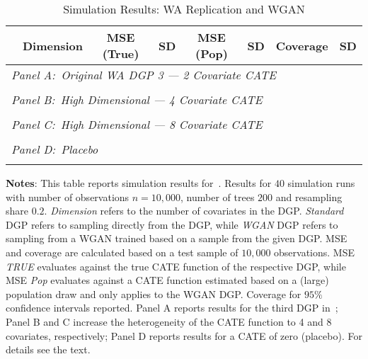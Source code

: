 \documentclass[11pt, a4paper, leqno]{article}
\begin{document}
\begin{table}
    \caption{Simulation Results: WA Replication and WGAN}\label{table:wa_rep_wgan}
    \begin{threeparttable}
        \center
        \begin{tabular}{lccccccc}
            & Dimension & MSE (True) & SD & MSE (Pop) & SD & Coverage & SD \\
            \toprule
            \multicolumn{8}{l}{\textit{Panel A:\ Original WA DGP 3 --- 2 Covariate CATE}} \\
             \\
            \midrule

            \multicolumn{8}{l}{\textit{Panel B:\ High Dimensional --- 4 Covariate CATE}} \\
             \\
            \midrule

            \multicolumn{8}{l}{\textit{Panel C:\ High Dimensional --- 8 Covariate CATE}} \\
             \\
            \midrule

            \multicolumn{8}{l}{\textit{Panel D:\ Placebo}} \\
             \\
            \bottomrule
        \end{tabular}
        \begin{tablenotes}
            \small
            \item \textbf{Notes}: This table reports simulation results for~\citet{wager2018estimation}.
            Results for $40$ simulation runs with number of observations $n=10,000$, number of trees $200$ and resampling share $0.2$.
            \textit{Dimension} refers to the number of covariates in the DGP\@. \textit{Standard} DGP refers to sampling directly from the DGP, while \textit{WGAN} DGP refers to sampling from a WGAN trained based on a sample from the given DGP\@.
            MSE and coverage are calculated based on a test sample of $10,000$ observations. MSE \textit{TRUE} evaluates against the true CATE function of the respective DGP, while MSE \textit{Pop} evaluates against a CATE function estimated based on a (large) population draw and only applies to the WGAN DGP\@.
            Coverage for $95\%$ confidence intervals reported.
            Panel A reports results for the third DGP in~\citet{wager2018estimation}; Panel B and C increase the heterogeneity of the CATE function to 4 and 8 covariates, respectively; Panel D reports results for a CATE of zero (placebo).
            For details see the text.
        \end{tablenotes}
    \end{threeparttable}
\end{table}
\end{document}
